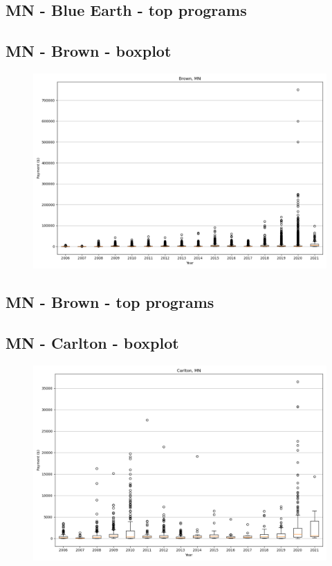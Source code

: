 \subsection*{MN - Blue Earth - top programs}

\newpage
\subsection*{MN - Brown - boxplot}
\begin{figure}[h]
\centering
\includegraphics[width=7in]{../output/boxplots/counties/Brown-MN_boxplot.png}
\end{figure}


\subsection*{MN - Brown - top programs}

\newpage
\subsection*{MN - Carlton - boxplot}
\begin{figure}[h]
\centering
\includegraphics[width=7in]{../output/boxplots/counties/Carlton-MN_boxplot.png}
\end{figure}


